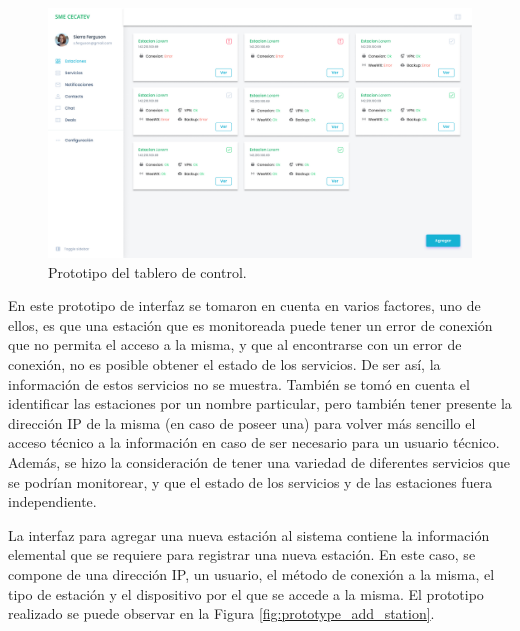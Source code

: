 \begin{figure}[!ht]
	\centering
	\includegraphics[width=1\linewidth]{images/diagrams/0.0.0_Main_interface.png}
	\caption{Prototipo del tablero de control.}
	\label{fig:prototype_main_interface}
\end{figure}

En este prototipo de interfaz se tomaron en cuenta en varios factores, uno de ellos, es que una estación que es monitoreada puede tener un error de conexión que no permita el acceso a la misma, y que al encontrarse con un error de conexión, no es posible obtener el estado de los servicios. De ser así, la información de estos servicios no se muestra. También se tomó en cuenta el identificar las estaciones por un nombre particular, pero también tener presente la dirección IP de la misma (en caso de poseer una) para volver más sencillo el acceso técnico a la información en caso de ser necesario para un usuario técnico. Además, se hizo la consideración de tener una variedad de diferentes servicios que se podrían monitorear, y que el estado de los servicios y de las estaciones fuera independiente.

\pagebreak

La interfaz para agregar una nueva estación al sistema contiene la información elemental que se requiere para registrar una nueva estación. En este caso, se compone de una dirección IP, un usuario, el método de conexión a la misma, el tipo de estación y el dispositivo por el que se accede a la misma. El prototipo realizado se puede observar en la Figura \ref{fig:prototype_add_station}.


